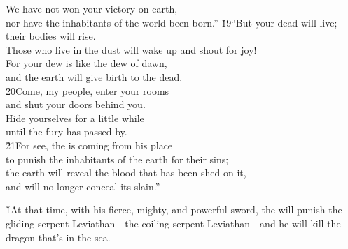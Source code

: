 \begin{poetry}
\poeml We have not won your victory on earth, \\
\poeml nor have the inhabitants of the world been born.''
\poeml \v{19}``But your dead will live; their bodies will rise. \\
\poeml Those who live in the dust will wake up and shout for joy! \\
\poeml For your dew is like the dew of dawn, \\
\poeml and the earth will give birth to the dead. \\
\poeml \v{20}Come, my people, enter your rooms \\
\poemll    and shut your doors behind you. \\
\poeml Hide yourselves for a little while \\
\poemll    until the fury has passed by. \\
\poeml \v{21}For see, the  is coming from his place \\
\poemll    to punish the inhabitants of the earth for their sins; \\
\poeml the earth will reveal the blood that has been shed on it, \\
\poemll    and will no longer conceal its slain.''
\end{poetry}

\v{1}At that time, with his fierce, mighty, and powerful sword, the  will punish the gliding serpent Leviathan---the coiling serpent Leviathan---and he will kill the dragon that's in the sea.

